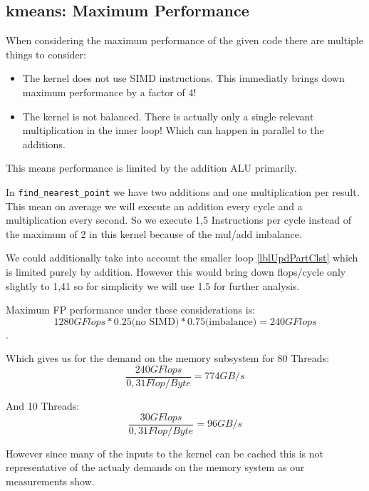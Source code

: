\subsection{kmeans: Maximum Performance}

When considering the maximum performance of the given code there are multiple things to consider:

\begin{itemize}
	\item The kernel does not use SIMD instructions. This immediatly brings down maximum performance by a factor of 4!
	\item The kernel is not balanced. There is actually only a single relevant multiplication in the inner loop! Which can happen in parallel to the additions.
\end{itemize}

This means performance is limited by the addition ALU primarily.

In \texttt{find\_nearest\_point} we have two additions and one multiplication per result. This mean on average we will execute an addition every cycle and a multiplication every second.
So we execute 1,5 Instructions per cycle instead of the maximum of 2 in this kernel because of the mul/add imbalance.

We could additionally take into account the smaller loop \autoref{lblUpdPartClst} which is limited purely by addition.
However this would bring down flops/cycle only slightly to 1,41 so for simplicity we will use 1.5 for further analysis.

Maximum FP performance under these considerations is:
$$1280 GFlops * 0.25 \text{(no SIMD)}  * 0.75 \text{(imbalance)} = 240 GFlops$$.

Which gives us for the demand on the memory subsystem for 80 Threads:
$$\frac{240 GFlops}{0,31 Flop/Byte} = 774 GB/s$$

And 10 Threads:
$$\frac{30 GFlops}{0,31 Flop/Byte} = 96 GB/s$$

However since many of the inputs to the kernel can be cached this is not representative of the actualy demands on the memory system as our measurements show.

















\newpage

